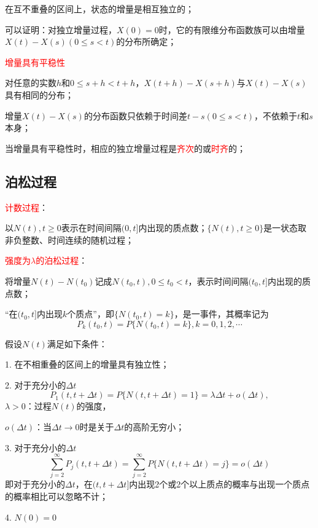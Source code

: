 \documentclass[12pt,a4paper]{article}
\begin{document}
在互不重叠的区间上，状态的增量是相互独立的；

可以证明：对独立增量过程，$X(0) = 0$时，它的有限维分布函数族可以由增量$X(t)-X(s)(0\leq s < t)$的分布所确定；

\textcolor{red}{增量具有平稳性}

对任意的实数$h$和$0\leq s+h < t+h$，$X(t+h) -X(s+h)$与$X(t) -X(s)$具有相同的分布；

增量$X(t) -X(s)$的分布函数只依赖于时间差$t-s(0\leq s < t)$，不依赖于$t$和$s$本身；

当增量具有平稳性时，相应的独立增量过程是\textcolor{red}{齐次}的或\textcolor{red}{时齐}的；

\subsection{泊松过程}
\textcolor{red}{计数过程}：

以$N(t), t \geq 0$表示在时间间隔$(0,t]$内出现的质点数；$\{N(t), t \geq 0\}$是一状态取非负整数、时间连续的随机过程；

\textcolor{red}{强度为$\lambda$的泊松过程}：

将增量$N(t)-N(t_0)$记成$N(t_0, t), 0 \leq t_0 < t$，表示时间间隔$(t_0, t]$内出现的质点数；

“在$(t_0, t]$内出现$k$个质点”，即$\{N(t_0, t) = k\}$，是一事件，其概率记为
\begin{equation}
P_k(t_0, t) = P\{N(t_0, t) = k \}, k = 0, 1, 2, \cdots
\end{equation}

假设$N(t)$满足如下条件：

1. 在不相重叠的区间上的增量具有独立性；

2. 对于充分小的$\Delta t$
\begin{equation}
P_1(t, t+\Delta t) = P\{N(t, t+\Delta t) = 1 \} = \lambda \Delta t +\mathit{o}(\Delta t),
\end{equation}
$\lambda > 0$：过程$N(t)$的强度，

$\mathit{o}(\Delta t)$：当$\Delta t \rightarrow 0$时是关于$\Delta t$的高阶无穷小；

3. 对于充分小的$\Delta t$
\begin{equation}
\sum_{j=2}^{\infty} P_j(t, t+\Delta t) = \sum_{j=2}^{\infty} P\{ N(t, t+\Delta t) = j\} = \mathit{o}(\Delta t)
\end{equation}
即对于充分小的$\Delta t$，在$(t, t+\Delta t]$内出现2个或2个以上质点的概率与出现一个质点的概率相比可以忽略不计；

4. $N(0) = 0$
\end{document}

